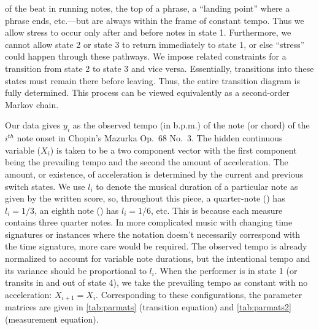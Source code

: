 \documentclass[aoas]{imsart}
\begin{document}
of the beat in running notes, the top of a
phrase, a ``landing point'' where a phrase ends, etc.---but are always
within the frame of constant tempo. Thus we allow stress to occur only
after and before notes in state 1. Furthermore, we cannot allow
state 2 or state 3 to return immediately to state 1, or else ``stress'' could
happen through these pathways. We impose related constraints for a transition from state 2
to state 3 and vice versa. Essentially, transitions into these states must remain
there before leaving. Thus, the entire transition diagram is
fully determined. This process can  be viewed equivalently as a
second-order Markov chain.


Our data gives $y_i$ as the observed tempo (in b.p.m.) of the note (or
chord) of the $i^{th}$ note onset in Chopin's Mazurka Op.\ 68 No.\ 3. The
hidden continuous variable ($X_i$) is 
taken to be a two component vector with the first component being the
prevailing tempo and the second the amount of acceleration. The amount, or
existence, of acceleration is determined by the current and previous
switch states. We use $l_i$ to denote the musical duration of
a particular note as given by the written score, so, throughout this piece, a quarter-note (\quarternote) has $l_i=1/3$, an
eighth note (\eighthnote) has $l_i=1/6$, etc. This is because each
measure contains three quarter notes. In more complicated
music with changing time signatures or instances where the notation
doesn't necessarily correspond with the time signature, more care
would be required. The observed tempo is already normalized to account
for variable note durations, but the intentional tempo and its
variance should be proportional to $l_i$. When the performer is in state 1 (or
transits in and out of state 4), we take the prevailing tempo as
constant with no acceleration: $X_{i+1} = X_i$. 
Corresponding to these configurations, the parameter
matrices are given in \autoref{tab:parmats} (transition equation) and
\autoref{tab:parmats2} (measurement equation).
\end{document}
